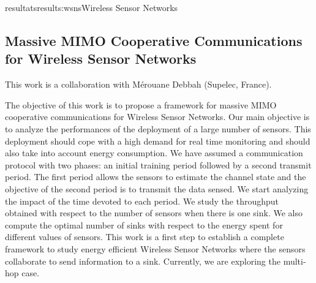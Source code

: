 \documentclass{ra2016}
\begin{document}
\begin{module}{resultats}{results:wsns}{Wireless Sensor Networks}
\subsection{Massive MIMO Cooperative Communications for Wireless Sensor Networks}

\begin{participants}
\end{participants}

This work is a collaboration with M\'erouane Debbah (Supelec, France).

The objective of this work is to propose a framework for massive MIMO cooperative communications for Wireless Sensor Networks. Our main objective is  to analyze the performances of the deployment of a large number of sensors. This deployment should cope with a high demand for real time monitoring and should also take into account energy consumption. We have assumed a communication protocol with two phases: an initial training period followed by a second transmit period. The first period allows the sensors to estimate the channel state and the objective of the second period is to transmit the data sensed. We start analyzing the impact of the time devoted to each period. We study the throughput obtained with respect to the number of sensors when there is one sink. We also compute the optimal number of sinks with respect to the energy spent for different values of sensors. This work is a first step to establish a complete framework to study energy efficient Wireless Sensor Networks where the sensors collaborate to send information to a sink. Currently, we are exploring the multi-hop case.

\end{module}
\end{document}
